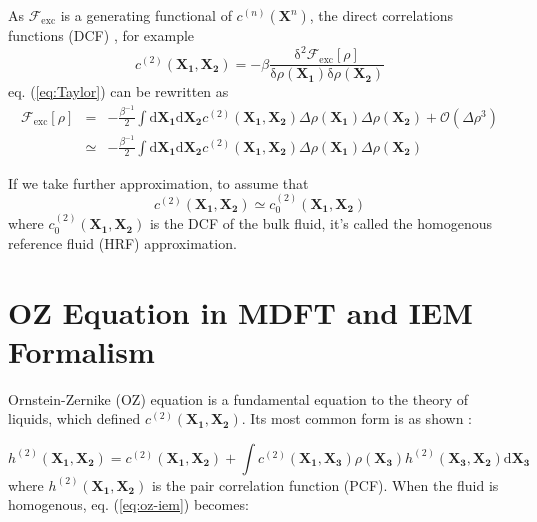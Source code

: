 As $\mathcal{F}_{\mathrm{exc}}$ is a generating functional of $c^{(n)}(\mathbf{X}^{n})$,
the direct correlations functions (DCF) \citep{Hensen-McDonald},
for example
\begin{equation}
c^{(2)}(\mathbf{X_{1}},\mathbf{X_{2}})=-\beta\frac{\mathrm{\delta}^{2}\mathcal{F}_{\mathrm{exc}}\left[\rho\right]}{\mathrm{\delta}\rho(\mathbf{X_{1}})\mathrm{\delta}\rho(\mathbf{X_{2}})}
\end{equation}
eq. (\ref{eq:Taylor}) can be rewritten as
\begin{eqnarray}
\mathcal{F}_{\mathrm{exc}}\left[\rho\right] & = & -\frac{\beta^{-1}}{2}\int\mathrm{d}\mathbf{X_{1}}\mathrm{d}\mathbf{X_{2}}c^{(2)}(\mathbf{X_{1}},\mathbf{X_{2}})\Delta\rho(\mathbf{X_{1}})\Delta\rho(\mathbf{X_{2}})+\mathcal{O}(\Delta\rho^{3})\nonumber \\
 & \simeq & -\frac{\beta^{-1}}{2}\int\mathrm{d}\mathbf{X_{1}}\mathrm{d}\mathbf{X_{2}}c^{(2)}(\mathbf{X_{1}},\mathbf{X_{2}})\Delta\rho(\mathbf{X_{1}})\Delta\rho(\mathbf{X_{2}})\label{eq:fexc-2nd-term}
\end{eqnarray}


If we take further approximation, to assume that
\begin{equation}
c^{(2)}(\mathbf{X_{1}},\mathbf{X_{2}})\simeq c_{0}^{(2)}(\mathbf{X_{1}},\mathbf{X_{2}})
\end{equation}
where $c_{0}^{(2)}(\mathbf{X_{1}},\mathbf{X_{2}})$ is the DCF of
the bulk fluid, it's called the homogenous reference fluid (HRF) approximation.


\section{OZ Equation in MDFT and IEM Formalism}

Ornstein-Zernike (OZ) equation is a fundamental equation to the theory
of liquids, which defined $c^{(2)}(\mathbf{X_{1}},\mathbf{X_{2}})$.
Its most common form is as shown \citep{Hensen-McDonald}:

\begin{equation}
h^{(2)}(\mathbf{X_{1}},\mathbf{X_{2}})=c^{(2)}(\mathbf{X_{1}},\mathbf{X_{2}})+\int c^{(2)}(\mathbf{X_{1}},\mathbf{X_{3}})\rho(\mathbf{X_{3}})h^{(2)}(\mathbf{X_{3}},\mathbf{X_{2}})\mathrm{d}\mathbf{X_{3}}\label{eq:oz-iem}
\end{equation}
where $h^{(2)}(\mathbf{X_{1}},\mathbf{X_{2}})$ is the pair correlation
function (PCF). When the fluid is homogenous, eq. (\ref{eq:oz-iem})
becomes:


